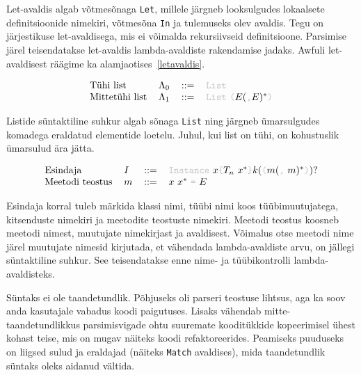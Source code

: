 \documentclass[12pt]{article}
\begin{document}
      Let-avaldis algab võtmesõnaga \verb!Let!, millele järgneb looksulgudes lokaalsete definitsioonide nimekiri, võtmesõna \verb!In! ja tulemuseks olev avaldis. Tegu on järjestikuse let-avaldisega, mis ei võimalda rekursiivseid definitsioone. Parsimise järel teisendatakse let-avaldis lambda-avaldiste rakendamise jadaks. Awfuli let-avaldisest räägime ka alamjaotises~\ref{letavaldis}.

      \begin{equation*}
        \begin{tabular}{llll}
          Tühi list      & $\Lambda_0$ & $::=$ & {\color{helehall}\verb!List!}                                                                                          \\
          Mittetühi list & $\Lambda_1$ & $::=$ & {\color{helehall}\verb!List!} {\color{helehall}\verb!(!}$E(${\color{helehall}\verb!,!}$E)^*${\color{helehall}\verb!)!}
        \end{tabular}
      \end{equation*}

      Listide süntaktiline suhkur algab sõnaga \verb!List! ning järgneb ümarsulgudes komadega eraldatud elementide loetelu. Juhul, kui list on tühi, on kohustuslik ümarsulud ära jätta.

      \begin{equation*}
        \begin{tabular}{llll}
          Esindaja        & $I$ & $::=$ & {\color{helehall}\verb!Instance!} $x${\color{helehall}\verb!{!}$T_n$ $x^*${\color{helehall}\verb!}!}$k(${\color{helehall}\verb!(!}$m(${\color{helehall}\verb!,!} $m)^*${\color{helehall}\verb!)!}$)?$ \\
          Meetodi teostus & $m$ & $::=$ & $x$ $x^*$ {\color{helehall}\verb!=!} $E$
        \end{tabular}
      \end{equation*}

      Esindaja korral tuleb märkida klassi nimi, tüübi nimi koos tüübimuutujatega, kitsenduste nimekiri ja meetodite teostuste nimekiri. Meetodi teostus koosneb meetodi nimest, muutujate nimekirjast ja avaldisest. Võimalus otse meetodi nime järel muutujate nimesid kirjutada, et vähendada lambda-avaldiste arvu, on jällegi süntaktiline suhkur. See teisendatakse enne nime- ja tüübikontrolli lambda-avaldisteks.

      Süntaks ei ole taandetundlik. Põhjuseks oli parseri teostuse lihtsus, aga ka soov anda kasutajale vabadus koodi paigutuses. Lisaks vähendab mitte-taandetundlikkus parsimisvigade ohtu suuremate kooditükkide kopeerimisel ühest kohast teise, mis on mugav näiteks koodi refaktoreerides. Peamiseks puuduseks on liigsed sulud ja eraldajad (näiteks \verb!Match! avaldises), mida taandetundlik süntaks oleks aidanud vältida.
\end{document}
